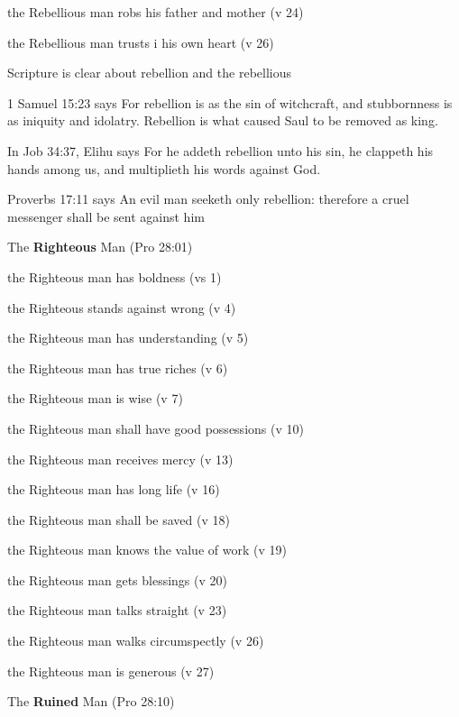\begin{compactenum}[I.]
\begin{compactenum}[A.]
    	\item the Rebellious man robs his father and mother (v 24)
    	\item the Rebellious man trusts i his own heart (v 26)
    \end{compactenum}
Scripture is clear about rebellion and the rebellious
    \begin{compactenum}[1.]
    	\item 1 Samuel 15:23 says For rebellion is as the sin of witchcraft, and stubbornness is as iniquity and idolatry. Rebellion is what caused Saul to be removed as king.
    	\item In Job 34:37, Elihu says For he addeth rebellion unto his sin, he clappeth his hands among us, and multiplieth his words against God.
    	\item Proverbs 17:11 says An evil man seeketh only rebellion: therefore a cruel messenger shall be sent against him
	\end{compactenum}
	   \item The \textbf{Righteous} Man (Pro 28:01) 
    \begin{compactenum}[A.]
    	\item the Righteous man has boldness (vs 1)
    	\item the Righteous stands against wrong (v 4)
    	\item the Righteous man has understanding (v 5)
    	\item the Righteous man has true riches (v 6)
    	\item the Righteous man is wise (v 7)
    	\item the Righteous man shall have good possessions (v 10)
    	\item the Righteous man receives mercy (v 13)
    	\item the Righteous man has long life (v 16)
    	\item the Righteous man shall be saved (v 18)
    	\item the Righteous man knows the value of work (v 19)
    	\item the Righteous man gets blessings (v 20)
    	\item the Righteous man talks straight (v 23)
    	\item the Righteous man walks circumspectly (v 26)
    	\item the Righteous man is generous (v 27)
	\end{compactenum}
    \item The \textbf{Ruined} Man (Pro 28:10) 

\end{compactenum}
